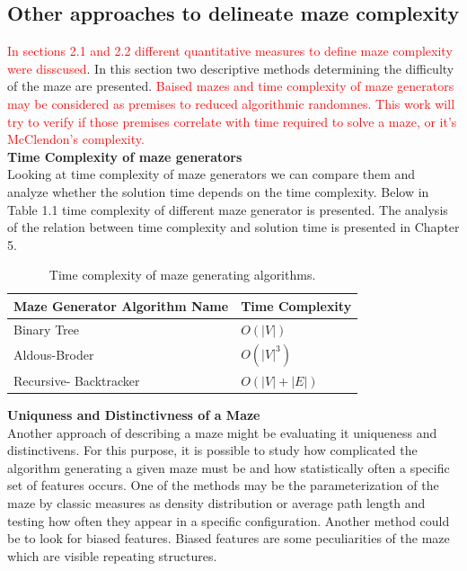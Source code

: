 \subsection{Other approaches to delineate maze complexity }
\textcolor{red}{In sections 2.1 and 2.2 different quantitative measures to define maze complexity were disscused}. In this section two descriptive methods determining the difficulty of the maze are presented.\textcolor{red}{ Baised mazes and time complexity of maze generators may be considered as premises to reduced algorithmic randomnes. This work will try to verify if those premises correlate with time required to solve a maze, or it's McClendon’s complexity. } \\ \newline
\textbf{Time Complexity of maze generators}\\
Looking at time complexity of maze generators we can compare them and  analyze whether the solution time depends on the time complexity. Below in Table 1.1 time complexity of different maze generator is presented. The analysis of the relation between time complexity and solution time is presented in Chapter 5.\\
\begin{table}[!h]
\begin{center} 
\begin{tabular}{ |p{6cm}||p{3cm}| } 
\hline Maze Generator Algorithm Name& Time Complexity\\ \hline Binary Tree\cite{Cormen} & $O(|V|)$\\ Aldous-Broder\cite{Nunes}& $O(|V|^3)$ \\ 
Recursive- Backtracker\cite[Puntambekar]& $O(|V|+|E|)$\\ 
\hline
 \end{tabular} 
\caption{\label{tab:table-name}Time complexity of maze generating algorithms.} 
\end{center}
 \end{table}
 \newline
 \newline
\textbf{Uniquness and Distinctivness of a Maze}\\
Another approach of describing a maze might be evaluating it uniqueness and distinctivens. For this purpose, it is possible to study how complicated the algorithm generating a given maze must be and how statistically often a specific set of features occurs. One of the methods may be the parameterization of the maze by classic measures as density distribution or average path length and testing how often they appear in a specific configuration. Another method could be to look for biased features. Biased features are some peculiarities of the maze which are visible repeating structures.
